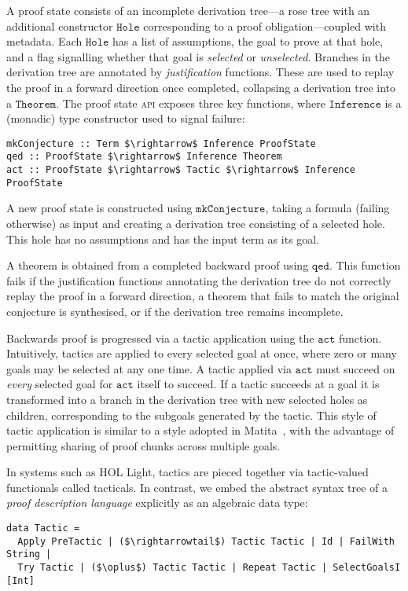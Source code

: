 \documentclass{llncs}
\begin{document}
A proof state consists of an incomplete derivation tree---a rose tree with an additional constructor $\mathtt{Hole}$ corresponding to a proof obligation---coupled with metadata.
Each $\mathtt{Hole}$ has a list of assumptions, the goal to prove at that hole, and a flag signalling whether that goal is \emph{selected} or \emph{unselected}.
Branches in the derivation tree are annotated by \emph{justification} functions.
These are used to replay the proof in a forward direction once completed, collapsing a derivation tree into a $\mathtt{Theorem}$.
The proof state \textsc{api} exposes three key functions, where $\mathtt{Inference}$ is a (monadic) type constructor used to signal failure:
\begin{lstlisting}
mkConjecture :: Term $\rightarrow$ Inference ProofState
qed :: ProofState $\rightarrow$ Inference Theorem
act :: ProofState $\rightarrow$ Tactic $\rightarrow$ Inference ProofState
\end{lstlisting}

A new proof state is constructed using $\mathtt{mkConjecture}$, taking a formula (failing otherwise) as input and creating a derivation tree consisting of a selected hole.
This hole has no assumptions and has the input term as its goal.

A theorem is obtained from a completed backward proof using $\mathtt{qed}$.
This function fails if the justification functions annotating the derivation tree do not correctly replay the proof in a forward direction, a theorem that fails to match the original conjecture is synthesised, or if the derivation tree remains incomplete.

Backwards proof is progressed via a tactic application using the $\mathtt{act}$ function.
Intuitively, tactics are applied to every selected goal at once, where zero or many goals may be selected at any one time.
A tactic applied via $\mathtt{act}$ must succeed on \emph{every} selected goal for $\mathtt{act}$ itself to succeed.
If a tactic succeeds at a goal it is transformed into a branch in the derivation tree with new selected holes as children, corresponding to the subgoals generated by the tactic.
This style of tactic application is similar to a style adopted in Matita~\cite{asperti:matita:2011}, with the advantage of permitting sharing of proof chunks across multiple goals.

In systems such as HOL Light, tactics are pieced together via tactic-valued functionals called tacticals.
In contrast, we embed the abstract syntax tree of a \emph{proof description language} explicitly as an algebraic data type:
\begin{lstlisting}
data Tactic =
  Apply PreTactic | ($\rightarrowtail$) Tactic Tactic | Id | FailWith String |
  Try Tactic | ($\oplus$) Tactic Tactic | Repeat Tactic | SelectGoalsI [Int]
\end{lstlisting}
\end{document}
